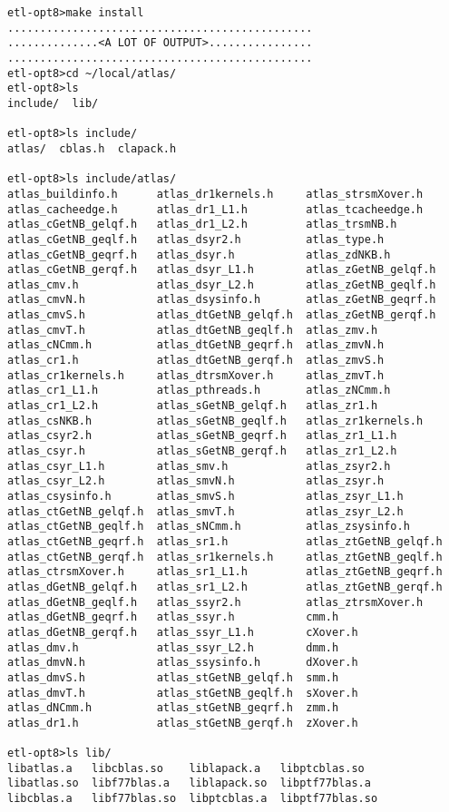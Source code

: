 \documentclass[11pt]{article}
\begin{document}
\begin{footnotesize}
\begin{verbatim}
etl-opt8>make install
...............................................
..............<A LOT OF OUTPUT>................
...............................................
etl-opt8>cd ~/local/atlas/
etl-opt8>ls
include/  lib/

etl-opt8>ls include/
atlas/  cblas.h  clapack.h

etl-opt8>ls include/atlas/
atlas_buildinfo.h      atlas_dr1kernels.h     atlas_strsmXover.h
atlas_cacheedge.h      atlas_dr1_L1.h         atlas_tcacheedge.h
atlas_cGetNB_gelqf.h   atlas_dr1_L2.h         atlas_trsmNB.h
atlas_cGetNB_geqlf.h   atlas_dsyr2.h          atlas_type.h
atlas_cGetNB_geqrf.h   atlas_dsyr.h           atlas_zdNKB.h
atlas_cGetNB_gerqf.h   atlas_dsyr_L1.h        atlas_zGetNB_gelqf.h
atlas_cmv.h            atlas_dsyr_L2.h        atlas_zGetNB_geqlf.h
atlas_cmvN.h           atlas_dsysinfo.h       atlas_zGetNB_geqrf.h
atlas_cmvS.h           atlas_dtGetNB_gelqf.h  atlas_zGetNB_gerqf.h
atlas_cmvT.h           atlas_dtGetNB_geqlf.h  atlas_zmv.h
atlas_cNCmm.h          atlas_dtGetNB_geqrf.h  atlas_zmvN.h
atlas_cr1.h            atlas_dtGetNB_gerqf.h  atlas_zmvS.h
atlas_cr1kernels.h     atlas_dtrsmXover.h     atlas_zmvT.h
atlas_cr1_L1.h         atlas_pthreads.h       atlas_zNCmm.h
atlas_cr1_L2.h         atlas_sGetNB_gelqf.h   atlas_zr1.h
atlas_csNKB.h          atlas_sGetNB_geqlf.h   atlas_zr1kernels.h
atlas_csyr2.h          atlas_sGetNB_geqrf.h   atlas_zr1_L1.h
atlas_csyr.h           atlas_sGetNB_gerqf.h   atlas_zr1_L2.h
atlas_csyr_L1.h        atlas_smv.h            atlas_zsyr2.h
atlas_csyr_L2.h        atlas_smvN.h           atlas_zsyr.h
atlas_csysinfo.h       atlas_smvS.h           atlas_zsyr_L1.h
atlas_ctGetNB_gelqf.h  atlas_smvT.h           atlas_zsyr_L2.h
atlas_ctGetNB_geqlf.h  atlas_sNCmm.h          atlas_zsysinfo.h
atlas_ctGetNB_geqrf.h  atlas_sr1.h            atlas_ztGetNB_gelqf.h
atlas_ctGetNB_gerqf.h  atlas_sr1kernels.h     atlas_ztGetNB_geqlf.h
atlas_ctrsmXover.h     atlas_sr1_L1.h         atlas_ztGetNB_geqrf.h
atlas_dGetNB_gelqf.h   atlas_sr1_L2.h         atlas_ztGetNB_gerqf.h
atlas_dGetNB_geqlf.h   atlas_ssyr2.h          atlas_ztrsmXover.h
atlas_dGetNB_geqrf.h   atlas_ssyr.h           cmm.h
atlas_dGetNB_gerqf.h   atlas_ssyr_L1.h        cXover.h
atlas_dmv.h            atlas_ssyr_L2.h        dmm.h
atlas_dmvN.h           atlas_ssysinfo.h       dXover.h
atlas_dmvS.h           atlas_stGetNB_gelqf.h  smm.h
atlas_dmvT.h           atlas_stGetNB_geqlf.h  sXover.h
atlas_dNCmm.h          atlas_stGetNB_geqrf.h  zmm.h
atlas_dr1.h            atlas_stGetNB_gerqf.h  zXover.h

etl-opt8>ls lib/
libatlas.a   libcblas.so    liblapack.a   libptcblas.so
libatlas.so  libf77blas.a   liblapack.so  libptf77blas.a
libcblas.a   libf77blas.so  libptcblas.a  libptf77blas.so
\end{verbatim}
\end{footnotesize}
\end{document}
